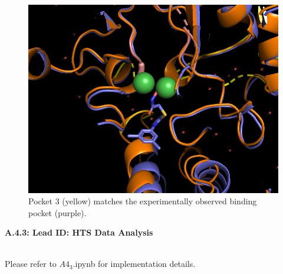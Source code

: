 \documentclass[a4paper,10pt]{article}
\begin{document}
\begin{figure}[h!]
	\centering
	\includegraphics[width=0.5\linewidth]{A4.2_11}
	\caption{Pocket 3 (yellow) matches the experimentally observed binding pocket (purple). }
\end{figure}

\begin{large}
	\vspace{1.0cm}
	\textbf{A.4.3: Lead ID: HTS Data Analysis}

\end{large}	\\ [2mm]


Please refer to $A4_3$.ipynb for implementation details.



\end{document}
